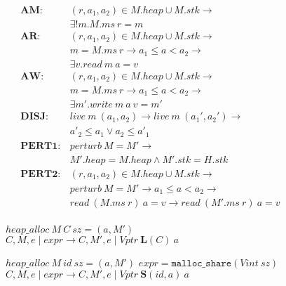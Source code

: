 \begin{figure}
  \scriptsize
  \begin{minipage}[t]{0.45\textwidth}
    \vspace{0em}
    \[\begin{aligned}
    \mathbf{AM} : & (r,a_1,a_2) \in M.heap \cup M.stk \rightarrow & \\
    & \exists ! m . M.ms ~ r = m & \\[0.75em]
    \mathbf{AR} : & (r,a_1,a_2) \in M.heap \cup M.stk \rightarrow & \\
    & m = M.ms ~ r \rightarrow a_1 \leq a < a_2 \rightarrow & \\
    & \exists v . \mathit{read} ~ m ~ a = v & \\[0.75em]
    \mathbf{AW} : & (r,a_1,a_2) \in M.heap \cup M.stk \rightarrow & \\
    & m = M.ms ~ r \rightarrow a_1 \leq a < a_2 \rightarrow & \\
    & \exists m' . \mathit{write} ~ m ~ a ~ v = m' & \\[0.75em]
    \mathbf{DISJ} : & \mathit{live} ~ m ~ (a_1,a_2) \rightarrow \mathit{live} ~ m ~ (a_1',a_2') \rightarrow & \\
    & a'_2 \leq a_1 \lor a_2 \leq a'_1 & \\[0.75em]
    \mathbf{PERT1} : & \mathit{perturb} ~ M = M' \rightarrow & \\
    & M'.heap = M.heap \land M'.stk = H.stk \\[0.75em]
    \mathbf{PERT2} : & (r,a_1,a_2) \in M.heap \cup M.stk \rightarrow & \\
    & \mathit{perturb} ~ M = M' \rightarrow a_1 \leq a < a_2 \rightarrow & \\
    & \mathit{read} ~ (M.ms ~ r) ~ a = v \rightarrow \mathit{read} ~ (M'.ms ~ r) ~ a = v & \\[0.75em]
    \end{aligned}\]
  \end{minipage}
  \begin{minipage}[t]{0.54\textwidth}
    \vspace{0em}
             {\(\mathit{heap\_alloc} ~ M ~ C ~ sz = (a, M')\)}
             {\(C,M,e\mid \mathit{expr} \longrightarrow
               C,M',e \mid \mathit{Vptr} ~ \mathbf{L}(C) ~ a\)}

                    {\(\mathit{heap\_alloc} ~ M ~ id ~ sz = (a, M')\)}
                    {\(\mathit{expr} = \mathtt{malloc\_share}(\mathit{Vint} ~ sz)\)}
                    {\(C,M,e \mid \mathit{expr} \longrightarrow
                      C,M',e \mid \mathit{Vptr} ~ \mathbf{S}(id,a) ~ a\)}


\end{minipage}
\end{figure}
